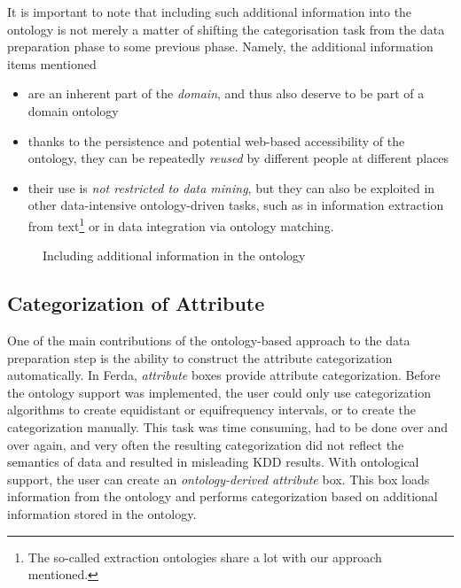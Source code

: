 It is important to note that including such additional information into the ontology is not merely a matter of shifting the categorisation task from the data preparation phase to some previous phase.
Namely, the additional information items mentioned
\begin{itemize}
	\item are an inherent part of the \emph{domain}, and thus also deserve to be part of a domain ontology
	\item thanks to the persistence and potential web-based accessibility of the ontology, they can be repeatedly \emph{reused} by different people at different places
	\item their use is \emph{not restricted to data mining}, but they can also be exploited in other data-intensive ontology-driven tasks, such as in information extraction from text\footnote{The so-called extraction ontologies \cite{Prickl} share a lot with our approach mentioned.} 
	or in data integration via ontology matching.
\end{itemize}

\begin{figure}[ht]
\centering
\mbox{}
\caption{Including additional information in the ontology}
\label{fig:Protege}
\end{figure}

\subsection{Categorization of Attribute}
One of the main contributions of the ontology-based approach to the data preparation step is the ability to construct the attribute categorization automatically. 
In Ferda, \emph{attribute} boxes provide attribute categorization. 
Before the ontology support was implemented, the user could only use categorization algorithms to create equidistant or equifrequency intervals, or to create the categorization manually. 
This task was time consuming, had to be done over and over again, and very often the resulting categorization did not reflect the semantics of data and resulted in misleading KDD results.
With ontological support, the user can create an \emph{ontology-derived attribute} box. 
This box loads information from the ontology and performs categorization based on additional information stored in the ontology. 

